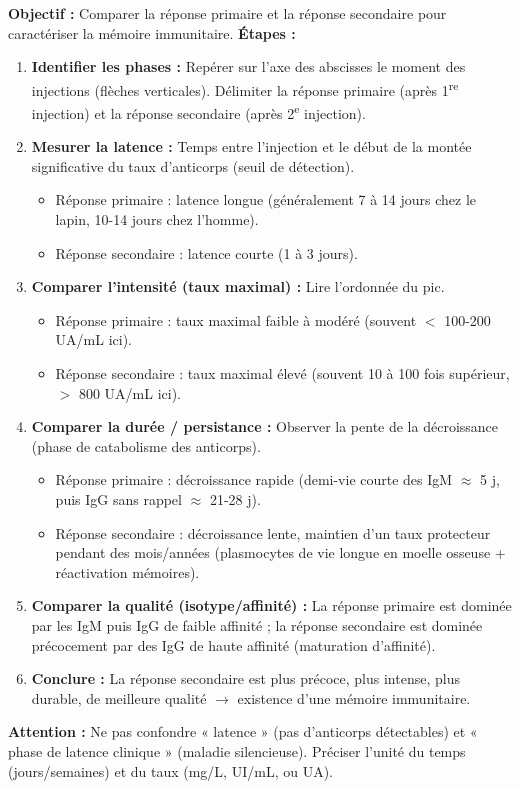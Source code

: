 \documentclass[11pt]{article}
\begin{document}
\begin{methode}
\textbf{Objectif :} Comparer la réponse primaire et la réponse secondaire pour caractériser la mémoire immunitaire.
\textbf{Étapes :}
\begin{enumerate}
    \item \textbf{Identifier les phases :} Repérer sur l'axe des abscisses le moment des injections (flèches verticales). Délimiter la réponse primaire (après 1\textsuperscript{re} injection) et la réponse secondaire (après 2\textsuperscript{e} injection).
    \item \textbf{Mesurer la latence :} Temps entre l'injection et le début de la montée significative du taux d'anticorps (seuil de détection).
        \begin{itemize}
            \item Réponse primaire : latence longue (généralement 7 à 14 jours chez le lapin, 10-14 jours chez l'homme).
            \item Réponse secondaire : latence courte (1 à 3 jours).
        \end{itemize}
    \item \textbf{Comparer l'intensité (taux maximal) :} Lire l'ordonnée du pic.
        \begin{itemize}
            \item Réponse primaire : taux maximal faible à modéré (souvent $<$ 100-200 UA/mL ici).
            \item Réponse secondaire : taux maximal élevé (souvent 10 à 100 fois supérieur, $>$ 800 UA/mL ici).
        \end{itemize}
    \item \textbf{Comparer la durée / persistance :} Observer la pente de la décroissance (phase de catabolisme des anticorps).
        \begin{itemize}
            \item Réponse primaire : décroissance rapide (demi-vie courte des IgM $\approx$ 5 j, puis IgG sans rappel $\approx$ 21-28 j).
            \item Réponse secondaire : décroissance lente, maintien d'un taux protecteur pendant des mois/années (plasmocytes de vie longue en moelle osseuse + réactivation mémoires).
        \end{itemize}
    \item \textbf{Comparer la qualité (isotype/affinité) :} La réponse primaire est dominée par les IgM puis IgG de faible affinité ; la réponse secondaire est dominée précocement par des IgG de haute affinité (maturation d'affinité).
    \item \textbf{Conclure :} La réponse secondaire est plus précoce, plus intense, plus durable, de meilleure qualité $\rightarrow$ existence d'une mémoire immunitaire.
\end{enumerate}
\textbf{Attention :} Ne pas confondre « latence » (pas d'anticorps détectables) et « phase de latence clinique » (maladie silencieuse). Préciser l'unité du temps (jours/semaines) et du taux (mg/L, UI/mL, ou UA).
\end{methode}
\end{document}
